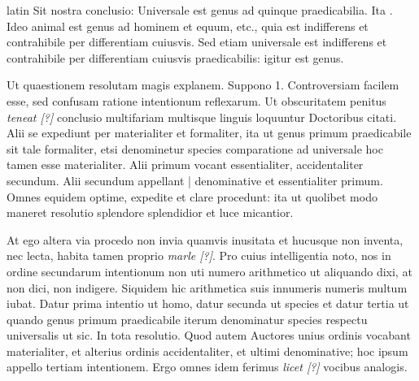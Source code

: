 \begin{otherlanguage*}{latin}
\pstart
  Sit nostra conclusio: Universale est genus ad quinque praedicabilia. Ita . Ideo animal est genus ad hominem et equum, etc., quia est indifferens et contrahibile per differentiam cuiusvis. Sed etiam universale est indifferens et contrahibile per differentiam cuiusvis praedicabilis: igitur est genus. 
\pend

\pstart
  Ut quaestionem resolutam magis explanem. Suppono 1. Controversiam facilem esse, sed confusam ratione intentionum reflexarum. Ut obscuritatem penitus \emph{teneat [?]} conclusio multifariam multisque linguis loquuntur Doctoribus citati. Alii se expediunt per materialiter et formaliter, ita ut genus primum praedicabile sit tale formaliter, etsi denominetur species comparatione ad universale hoc tamen esse materialiter. Alii primum vocant essentialiter, accidentaliter secundum. Alii secundum appellant \textnormal{|}   denominative et essentialiter primum. Omnes equidem optime, expedite et clare procedunt: ita ut quolibet modo maneret resolutio splendore splendidior et luce micantior. 
\pend

\pstart
  At ego altera via procedo non invia quamvis inusitata et hucusque non inventa, nec lecta, habita tamen proprio \emph{marle [?]}. Pro cuius intelligentia noto, nos in ordine secundarum intentionum non uti numero arithmetico ut aliquando dixi, at non dici, non indigere. Siquidem hic arithmetica suis innumeris numeris multum iubat. Datur prima intentio ut homo, datur secunda ut species et datur tertia ut quando genus primum praedicabile iterum denominatur species respectu universalis ut sic. In tota resolutio. Quod autem Auctores unius ordinis vocabant materialiter, et alterius ordinis accidentaliter, et ultimi denominative; hoc ipsum appello tertiam intentionem. Ergo omnes idem ferimus \emph{licet [?]} vocibus analogis. 
\pend


\end{otherlanguage*}
